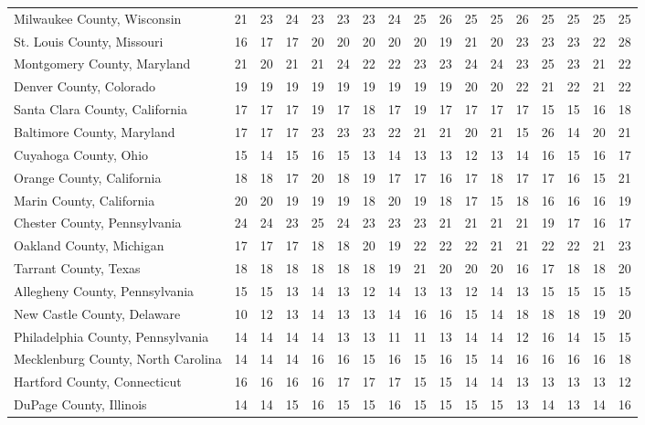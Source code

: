 \begin{landscape}
\begin{longtable}{lcccccccccccccccc}
Milwaukee County, Wisconsin & 21 & 23 & 24 & 23 & 23 & 23 & 24 & 25 & 26 & 25 & 25 & 26 & 25 & 25 & 25 & 25 \\
St. Louis County, Missouri & 16 & 17 & 17 & 20 & 20 & 20 & 20 & 20 & 19 & 21 & 20 & 23 & 23 & 23 & 22 & 28 \\
Montgomery County, Maryland & 21 & 20 & 21 & 21 & 24 & 22 & 22 & 23 & 23 & 24 & 24 & 23 & 25 & 23 & 21 & 22 \\
Denver County, Colorado & 19 & 19 & 19 & 19 & 19 & 19 & 19 & 19 & 19 & 20 & 20 & 22 & 21 & 22 & 21 & 22 \\
Santa Clara County, California & 17 & 17 & 17 & 19 & 17 & 18 & 17 & 19 & 17 & 17 & 17 & 17 & 15 & 15 & 16 & 18 \\
Baltimore County, Maryland & 17 & 17 & 17 & 23 & 23 & 23 & 22 & 21 & 21 & 20 & 21 & 15 & 26 & 14 & 20 & 21 \\
Cuyahoga County, Ohio & 15 & 14 & 15 & 16 & 15 & 13 & 14 & 13 & 13 & 12 & 13 & 14 & 16 & 15 & 16 & 17 \\
Orange County, California & 18 & 18 & 17 & 20 & 18 & 19 & 17 & 17 & 16 & 17 & 18 & 17 & 17 & 16 & 15 & 21 \\
Marin County, California & 20 & 20 & 19 & 19 & 19 & 18 & 20 & 19 & 18 & 17 & 15 & 18 & 16 & 16 & 16 & 19 \\
Chester County, Pennsylvania & 24 & 24 & 23 & 25 & 24 & 23 & 23 & 23 & 21 & 21 & 21 & 21 & 19 & 17 & 16 & 17 \\
Oakland County, Michigan & 17 & 17 & 17 & 18 & 18 & 20 & 19 & 22 & 22 & 22 & 21 & 21 & 22 & 22 & 21 & 23 \\
Tarrant County, Texas & 18 & 18 & 18 & 18 & 18 & 18 & 19 & 21 & 20 & 20 & 20 & 16 & 17 & 18 & 18 & 20 \\
Allegheny County, Pennsylvania & 15 & 15 & 13 & 14 & 13 & 12 & 14 & 13 & 13 & 12 & 14 & 13 & 15 & 15 & 15 & 15 \\
New Castle County, Delaware & 10 & 12 & 13 & 14 & 13 & 13 & 14 & 16 & 16 & 15 & 14 & 18 & 18 & 18 & 19 & 20 \\
Philadelphia County, Pennsylvania & 14 & 14 & 14 & 14 & 13 & 13 & 11 & 11 & 13 & 14 & 14 & 12 & 16 & 14 & 15 & 15 \\
Mecklenburg County, North Carolina & 14 & 14 & 14 & 16 & 16 & 15 & 16 & 15 & 16 & 15 & 14 & 16 & 16 & 16 & 16 & 18 \\
Hartford County, Connecticut & 16 & 16 & 16 & 16 & 17 & 17 & 17 & 15 & 15 & 14 & 14 & 13 & 13 & 13 & 13 & 12 \\
DuPage County, Illinois & 14 & 14 & 15 & 16 & 15 & 15 & 16 & 15 & 15 & 15 & 15 & 13 & 14 & 13 & 14 & 16 \\

\end{longtable}
\end{landscape}
